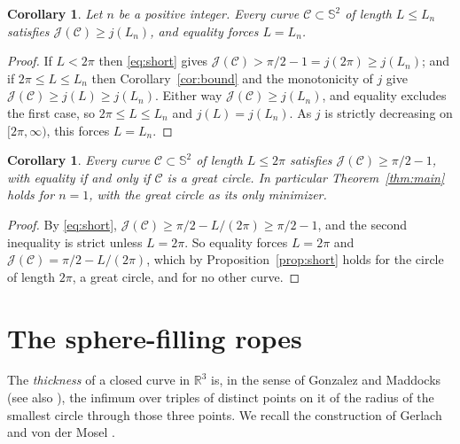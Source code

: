 \documentclass[11pt,oneside,reqno]{amsart}
\theoremstyle{plain}
\newtheorem{corollary}[theorem]{Corollary}
\theoremstyle{definition}
\newcommand{\Sph}{\mathbb{S}^{2}}
\newcommand{\R}{\mathbb{R}}
\begin{document}
\begin{corollary}\label{cor:exact}
Let $n$ be a positive integer. Every curve $\mathcal{C}\subset\Sph$ of length
$L\le L_{n}$ satisfies $\mathcal{J}(\mathcal{C})\ge j(L_{n})$, and equality forces
$L=L_{n}$.
\end{corollary}

\begin{proof}
If $L<2\pi$ then \eqref{eq:short} gives
$\mathcal{J}(\mathcal{C})>\pi/2-1=j(2\pi)\ge j(L_{n})$; and if $2\pi\le L\le L_{n}$
then Corollary~\ref{cor:bound} and the monotonicity of $j$ give
$\mathcal{J}(\mathcal{C})\ge j(L)\ge j(L_{n})$. Either way
$\mathcal{J}(\mathcal{C})\ge j(L_{n})$, and equality excludes the first case, so
$2\pi\le L\le L_{n}$ and $j(L)=j(L_{n})$. As $j$ is strictly decreasing on
$[2\pi,\infty)$, this forces $L=L_{n}$.
\end{proof}

\begin{corollary}\label{cor:greatcircle}
Every curve $\mathcal{C}\subset\Sph$ of length $L\le2\pi$ satisfies
$\mathcal{J}(\mathcal{C})\ge\pi/2-1$, with equality if and only if $\mathcal{C}$ is a
great circle. In particular Theorem~\ref{thm:main} holds for $n=1$, with the
great circle as its only minimizer.
\end{corollary}

\begin{proof}
By \eqref{eq:short}, $\mathcal{J}(\mathcal{C})\ge\pi/2-L/(2\pi)\ge\pi/2-1$, and
the second inequality is strict unless $L=2\pi$. So equality forces $L=2\pi$ and
$\mathcal{J}(\mathcal{C})=\pi/2-L/(2\pi)$, which by Proposition~\ref{prop:short}
holds for the circle of length $2\pi$, a great circle, and for no other curve.
\end{proof}

\section{The sphere-filling ropes}\label{sec:curves}

The \emph{thickness} of a closed curve in $\R^{3}$ is, in the sense of Gonzalez
and Maddocks \cite{GM99} (see also \cite[(1.1)]{GvdM2011b}), the infimum over
triples of distinct points on it of the radius of the smallest circle through
those three points. We recall the construction of Gerlach and von der Mosel
\cite{GvdM2011b}.
\end{document}
